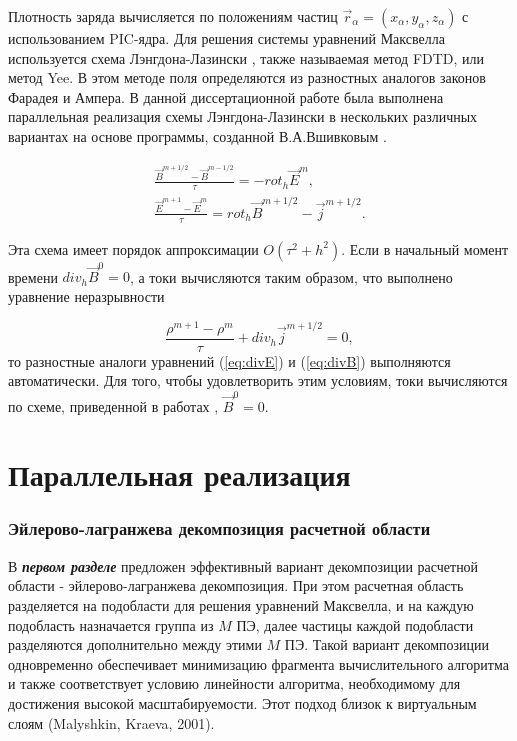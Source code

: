 Плотность заряда вычисляется по положениям частиц ${\vec{r}}_\alpha=(x_\alpha,y_\alpha,z_\alpha)$ с использованием PIC-ядра.
Для решения системы уравнений Максвелла используется схема Лэнгдона-Лазински \cite{lasin}, также называемая метод FDTD, или метод Yee\cite{Yee}. В этом методе поля определяются из разностных аналогов законов Фарадея и Ампера. В данной диссертационной работе была выполнена параллельная реализация схемы Лэнгдона-Лазински в нескольких различных вариантах  на основе программы, созданной В.А.Вшивковым \cite{laser}.

\begin{equation}
\label{FDTD}
\begin{array}{c}
\frac{{\vec{B}}^{m+1/2}-{\vec{B}}^{m-1/2}}{\tau}=-rot_h {\vec{E}}^m,
\\
\frac{{\vec{E}}^{m+1}-{\vec{E}}^m}{\tau}=rot_h {\vec{B}}^{m+1/2} - {\vec{j}}^{m+1/2}.
\end{array}
\end{equation}



Эта схема имеет порядок аппроксимации $O(\tau^2+h^2)$. Если в начальный момент времени $div_h{\vec{B}}^0=0$, а токи вычисляются таким образом, что выполнено уравнение неразрывности 

\begin{equation}
\frac{\rho^{m+1}-\rho^m}{\tau}+div_h {\vec{j}}^{m+1/2}=0,
\end{equation}
то разностные аналоги уравнений (\ref{eq:divE}) и (\ref{eq:divB}) выполняются автоматически.
Для того, чтобы удовлетворить этим условиям, токи вычисляются по схеме, приведенной в работах \cite{VshivkovPICbook, laser}, ${\vec{B}}^0=0$. 

\section{ Параллельная реализация} 

\subsubsection{Эйлерово-лагранжева декомпозиция расчетной области}



В \textbf{\textit{первом разделе}}  предложен эффективный вариант декомпозиции расчетной области - эйлерово-лагранжева декомпозиция.
При этом расчетная область разделяется на подобласти для решения уравнений Максвелла, и на каждую подобласть назначается группа из $M$ ПЭ, далее частицы каждой подобласти разделяются дополнительно между этими $M$ ПЭ. Такой вариант декомпозиции одновременно обеспечивает минимизацию фрагмента вычислительного алгоритма и также соответствует условию линейности алгоритма, необходимому для достижения высокой масштабируемости. Этот подход близок к виртуальным слоям (Malyshkin, Kraeva, 2001).

